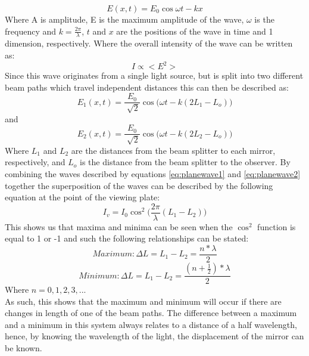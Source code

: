 \documentclass[12pt,a4paper,oneside]{report}
\begin{document}
\begin{equation}
E(x,t) = E_{0}\cos{\omega t - kx}
	\label{eq:planewave}
\end{equation}
Where A is amplitude, E is the maximum amplitude of the wave, $\omega$ is the frequency and $k = \frac{2\pi}{\lambda}$, $t$ and $x$ are the positions of the wave in time and 1 dimension, respectively.
Where the overall intensity of the wave can be written as:
\begin{equation}
I \propto <E^{2}>
	\label{eq:intensitypw}
\end{equation}
Since this wave originates from a single light source, but is split into two different beam paths which travel independent distances this can then be described as:
\begin{equation}
E_{1}(x,t) = \frac{E_{0}}{\sqrt[]{2}}\cos{\Big(\omega t - k(2L_{1} - L_{o})\Big)}
	\label{eq:planewave1}
\end{equation}
and
\begin{equation}
E_{2}(x,t) = \frac{E_{0}}{\sqrt[]{2}}\cos{\Big(\omega t - k(2L_{2} - L_{o})\Big)}
	\label{eq:planewave2}
\end{equation}
Where $L_{1}$ and $L_{2}$ are the distances from the beam splitter to each mirror, respectively, and $L_{o}$ is the distance from the beam splitter to the observer.
By combining the waves described by equations \ref{eq:planewave1} and \ref{eq:planewave2} together the superposition of the waves can be described by the following equation at the point of the viewing plate:
\begin{equation}
I_{v} = I_{0} \cos^{2}{\Big(\frac{2\pi}{\lambda}(L_{1} - L_{2})\Big)}
	\label{eq:finalwave}
\end{equation}
This shows us that maxima and minima can be seen when the $\cos^{2}$ function is equal to 1 or -1 and such the following relationships can be stated:
\begin{equation}
Maximum: \Delta L = L_{1} - L_{2} = \frac{n*\lambda}{2}
	\label{eq:fringesmax}
\end{equation}
\begin{equation}
Minimum: \Delta L = L_{1} - L_{2} = \frac{(n+\frac{1}{2})*\lambda}{2}
	\label{eq:fringesmin}
\end{equation}
Where $n = 0, 1, 2, 3, ...$ \\
As such, this shows that the maximum and minimum will occur if there are changes in length of one of the beam paths. The difference between a maximum and a minimum in this system always relates to a distance of a half wavelength, hence, by knowing the wavelength of the light, the displacement of the mirror can be known.\\
\end{document}
